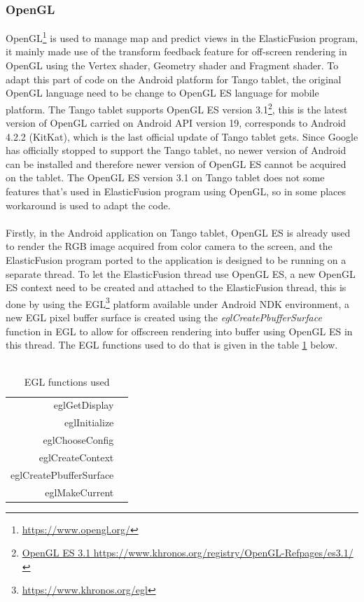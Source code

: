 \documentclass[12pt,twoside]{article}
\begin{document}
\subsubsection{OpenGL}
OpenGL\footnote{\url{https://www.opengl.org/}} is used to manage map and predict views in the ElasticFusion program, it mainly made use of the transform feedback feature for off-screen rendering in OpenGL using the Vertex shader, Geometry shader and Fragment shader. To adapt this part of code on the Android platform for Tango tablet, the original OpenGL language need to be change to OpenGL ES language for mobile platform. The Tango tablet supports OpenGL ES version 3.1\footnote{\url{OpenGL ES 3.1 https://www.khronos.org/registry/OpenGL-Refpages/es3.1/}}, this is the latest version of OpenGL carried on Android API version 19, corresponds to Android 4.2.2 (KitKat), which is the last official update of Tango tablet gets. Since Google has officially stopped to support the Tango tablet, no newer version of Android can be installed and therefore newer version of OpenGL ES cannot be acquired on the tablet. The OpenGL ES version 3.1 on Tango tablet does not some features that's used in ElasticFusion program using OpenGL, so in some places workaround is used to adapt the code.\\
\\
Firstly, in the Android application on Tango tablet, OpenGL ES is already used to render the RGB image acquired from color camera to the screen, and the ElasticFusion program ported to the application is designed to be running on a separate thread. To let the ElasticFusion thread use OpenGL ES, a new OpenGL ES context need to be created and attached to the ElasticFusion thread, this is done by using the EGL\footnote{\url{https://www.khronos.org/egl}} platform available under Android NDK environment, a new EGL pixel buffer surface is created using the \textit{eglCreatePbufferSurface} function in EGL to allow for offscreen rendering into buffer using OpenGL ES in this thread. The EGL functions used to do that is given in the table \ref{table:EGL functions} below.\\
\\
\begin{table}
\centering
\caption{EGL functions used}
\label{table:EGL functions}
\begin{tabular}{|r|l|}
  \hline
  eglGetDisplay \\
 eglInitialize  \\
  eglChooseConfig  \\
  eglCreateContext \\
  eglCreatePbufferSurface  \\
  eglMakeCurrent  \\
    \hline
\end{tabular}
\end{table}
\end{document}
